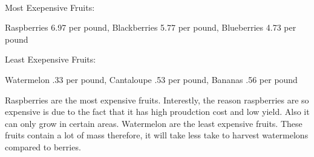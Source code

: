 \documentclass[11pt]{article}
\begin{document}
    \begin{center}
    \end{center}
    { \hspace*{\fill} \\}
    
    Most Exepensive Fruits:

Raspberries 6.97 per pound, Blackberries 5.77 per pound, Blueberries
4.73 per pound

Least Exepensive Fruits:

Watermelon .33 per pound, Cantaloupe .53 per pound, Bananas .56 per
pound

Raspberries are the most expensive fruits. Interestly, the reason
raspberries are so expensive is due to the fact that it has high
proudction cost and low yield. Also it can only grow in certain areas.
Watermelon are the least expensive fruits. These fruits contain a lot of
mass therefore, it will take less take to harvest watermelons compared
to berries.
\end{document}
